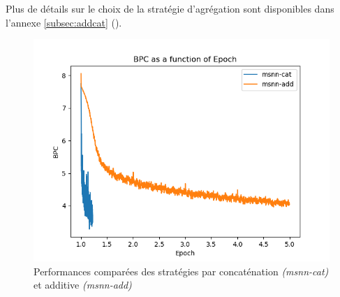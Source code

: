 Plus de détails sur le choix de la stratégie d'agrégation sont disponibles dans l'annexe \ref{subsec:addcat} (). 

\begin{figure}[H]
	\centering
	\includegraphics[width=\textwidth]{parts/appendix/reports-gmsnn/docs_esteban-latex/test_reports/comparative-bpc-msnn-det-msnn-cat.png}
	\caption[Performances comparées des stratégies additive et par concaténation]{Performances comparées des stratégies par concaténation \textit{(msnn-cat)} et additive \textit{(msnn-add)}}\label{fig:addcat}
\end{figure}